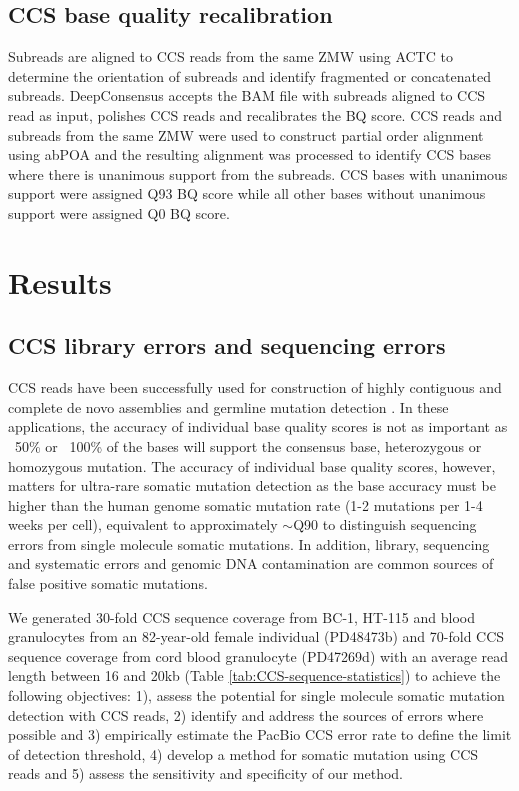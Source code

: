 \subsection{CCS base quality recalibration}

Subreads are aligned to CCS reads from the same ZMW using ACTC \cite{} to determine the orientation of subreads and identify fragmented or concatenated subreads. DeepConsensus accepts the BAM file with subreads aligned to CCS read as input, polishes CCS reads and recalibrates the BQ score. CCS reads and subreads from the same ZMW were used to construct partial order alignment using abPOA \cite{Gao2021-nf} and the resulting alignment was processed to identify CCS bases where there is unanimous support from the subreads. CCS bases with unanimous support were assigned Q93 BQ score while all other bases without unanimous support were assigned Q0 BQ score. 

\section{Results}

\subsection{CCS library errors and sequencing errors}

CCS reads have been successfully used for construction of highly contiguous and complete de novo assemblies \cite{} and germline mutation detection \cite{}. In these applications, the accuracy of individual base quality scores is not as important as ~50\% or ~100\% of the bases will support the consensus base, heterozygous or homozygous mutation. The accuracy of individual base quality scores, however, matters for ultra-rare somatic mutation detection as the base accuracy must be higher than the human genome somatic mutation rate (1-2 mutations per 1-4 weeks per cell), equivalent to approximately $\sim$Q90 to distinguish sequencing errors from single molecule somatic mutations. In addition, library, sequencing and systematic errors and genomic DNA contamination are common sources of false positive somatic mutations. 

We generated 30-fold CCS sequence coverage from BC-1, HT-115 and blood granulocytes from an 82-year-old female individual (PD48473b) and 70-fold CCS sequence coverage from cord blood granulocyte (PD47269d) with an average read length between 16 and 20kb (Table \ref{tab:CCS-sequence-statistics}) to achieve the following objectives: 1), assess the potential for single molecule somatic mutation detection with CCS reads, 2) identify and address the sources of errors where possible and 3) empirically estimate the PacBio CCS error rate to define the limit of detection threshold, 4) develop a method for somatic mutation using CCS reads and 5) assess the sensitivity and specificity of our method.

